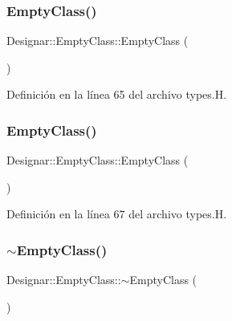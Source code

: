 \subsubsection{\texorpdfstring{Empty\+Class()}{EmptyClass()}\hspace{0.1cm}{\footnotesize\ttfamily [2/3]}}
{\footnotesize\ttfamily Designar\+::\+Empty\+Class\+::\+Empty\+Class (\begin{DoxyParamCaption}\item[{const \hyperlink{class_designar_1_1_empty_class}{Empty\+Class} \&}]{ }\end{DoxyParamCaption})\hspace{0.3cm}{\ttfamily [inline]}}



Definición en la línea 65 del archivo types.\+H.

\mbox{\label{class_designar_1_1_empty_class_aa18e6ee1ae08bc9500c9c0f91a6bae0c}} 
\subsubsection{\texorpdfstring{Empty\+Class()}{EmptyClass()}\hspace{0.1cm}{\footnotesize\ttfamily [3/3]}}
{\footnotesize\ttfamily Designar\+::\+Empty\+Class\+::\+Empty\+Class (\begin{DoxyParamCaption}\item[{\hyperlink{class_designar_1_1_empty_class}{Empty\+Class} \&\&}]{ }\end{DoxyParamCaption})\hspace{0.3cm}{\ttfamily [inline]}}



Definición en la línea 67 del archivo types.\+H.

\mbox{\label{class_designar_1_1_empty_class_a751a2dca8e5df75e3f6a528f4fa43656}} 
\subsubsection{\texorpdfstring{$\sim$\+Empty\+Class()}{~EmptyClass()}}
{\footnotesize\ttfamily Designar\+::\+Empty\+Class\+::$\sim$\+Empty\+Class (\begin{DoxyParamCaption}{ }\end{DoxyParamCaption})\hspace{0.3cm}{\ttfamily [inline]}}



